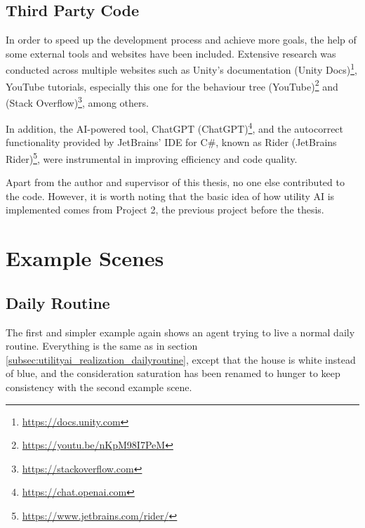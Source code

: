 \newpage

\subsection{Third Party Code}
\label{sec:utilitydesigner_implementation_thirdpartycode}

In order to speed up the development process and achieve more goals, the help of some external tools and websites have been included. Extensive research was conducted across multiple websites such as Unity's documentation (Unity Docs)\footnote{\url{https://docs.unity.com}}, YouTube tutorials, especially this one for the behaviour tree (YouTube)\footnote{\url{https://youtu.be/nKpM98I7PeM}} and (Stack Overflow)\footnote{\url{https://stackoverflow.com}}, among others.

In addition, the AI-powered tool, ChatGPT (ChatGPT)\footnote{\url{https://chat.openai.com}}, and the autocorrect functionality provided by JetBrains' IDE for C\#, known as Rider (JetBrains Rider)\footnote{\url{https://www.jetbrains.com/rider/}}, were instrumental in improving efficiency and code quality.

Apart from the author and supervisor of this thesis, no one else contributed to the code. However, it is worth noting that the basic idea of how utility AI is implemented comes from Project 2, the previous project before the thesis.

\section{Example Scenes}
\label{sec:utilitydesigner_implementation_examplescenes}
\subsection{Daily Routine}
\label{sec:utilitydesigner_implementation_examplescenes_dailyroutine}

The first and simpler example again shows an agent trying to live a normal daily routine. Everything is the same as in section \ref{subsec:utilityai_realization_dailyroutine}, except that the house is white instead of blue, and the consideration saturation has been renamed to hunger to keep consistency with the second example scene.


